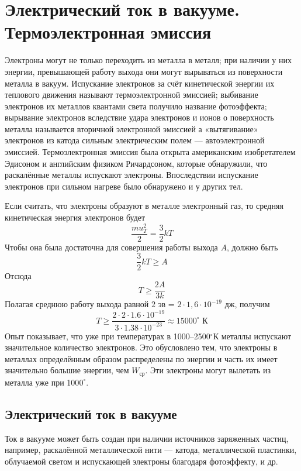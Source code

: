 \documentclass[a4paper,10pt]{book}
\begin{document}
\chapter{Электрический ток в вакууме. Термоэлектронная эмиссия}
Электроны могут не только переходить из металла в металл; при наличии у них энергии, превышающей работу выхода они могут вырываться из поверхности металла в вакуум. Испускание электронов за счёт кинетической энергии их теплового движения называют термоэлектронной эмиссией; выбивание электронов их металлов квантами света получило название фотоэффекта; вырывание электронов вследствие удара электронов и ионов о поверхность металла называется вторичной электронной эмиссией а «вытягивание» электронов из катода сильным электрическим полем — автоэлектронной эмиссией. Термоэлектронная эмиссия была открыта американским изобретателем Эдисоном и английским физиком Ричардсоном, которые обнаружили, что раскалённые металлы испускают электроны. Впоследствии испускание электронов при сильном нагреве было обнаружено и у других тел.

Если считать, что электроны образуют в металле электронный газ, то средняя кинетическая энергия электронов будет
\begin{equation}
\frac{mu_T^2}{2} = \frac{3}{2}kT\nonumber
\end{equation}
Чтобы она была достаточна для совершения работы выхода $A$, должно быть
\begin{equation}\label{lecture20_1}
\frac{3}{2}kT \geq A
\end{equation}
Отсюда
\begin{equation}
T \geq \frac{2A}{3k}\nonumber
\end{equation}
Полагая среднюю работу выхода равной $2 \text{ эв}$ = $2\cdot1,6 \cdot 10^{-19} \text{ дж}$, получим
\begin{equation}
T \geq \frac{2\cdot2\cdot1.6\cdot10^{-19}}{3\cdot1.38\cdot10^{-23}}\approx 15 000^{\circ}\text{ К}\nonumber
\end{equation}
Опыт показывает, что уже при температурах в 1000–2500$^{\circ}$К металлы испускают значительное количество электронов. Это обусловлено тем, что электроны в металлах определённым образом распределены по энергии и часть их имеет значительно большие энергии, чем $W_\text{ср}$. Эти электроны могут вылетать из металла уже при 100$0^{\circ}$.

\section{Электрический ток в вакууме}
Ток в вакууме может быть создан при наличии источников заряженных частиц, например, раскалённой металлической нити — катода, металлической пластинки, облучаемой светом и испускающей электроны благодаря фотоэффекту, и др.
\end{document}

